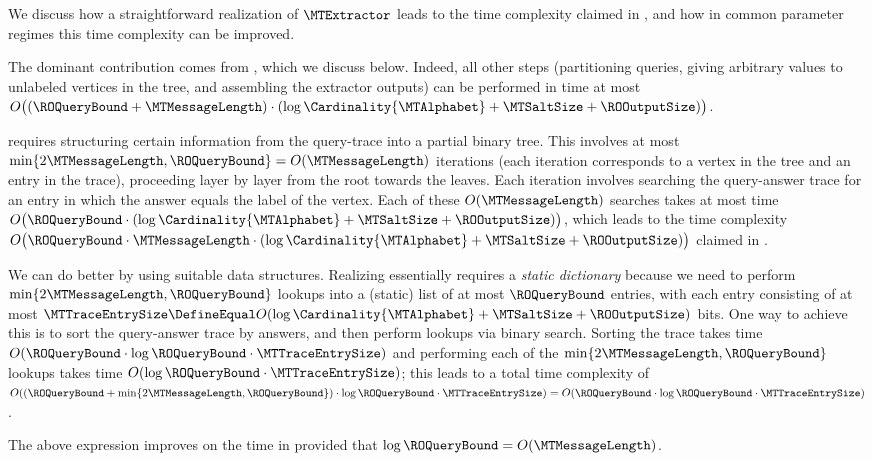 \begin{remark}
\label{remark:mt-extractor-time}
We discuss how a straightforward realization of $\MTExtractor$ leads to the time complexity claimed in , and how in common parameter regimes this time complexity can be improved.

The dominant contribution comes from , which we discuss below. Indeed, all other steps (partitioning queries, giving arbitrary values to unlabeled vertices in the tree, and assembling the extractor outputs) can be performed in time at most $O\big((\ROQueryBound + \MTMessageLength) \cdot (\log\Cardinality{\MTAlphabet} + \MTSaltSize + \ROOutputSize)\big)$.

 requires structuring certain information from the query-trace into a partial binary tree. This involves at most $\min\{2\MTMessageLength,\ROQueryBound\}=O(\MTMessageLength)$ iterations (each iteration corresponds to a vertex in the tree and an entry in the trace), proceeding layer by layer from the root towards the leaves. Each iteration involves searching the query-answer trace for an entry in which the answer equals the label of the vertex. Each of these $O(\MTMessageLength)$ searches takes at most time $O\big(\ROQueryBound \cdot (\log\Cardinality{\MTAlphabet} + \MTSaltSize + \ROOutputSize)\big)$, which leads to the time complexity $O\big( \ROQueryBound \cdot \MTMessageLength \cdot (\log\Cardinality{\MTAlphabet} + \MTSaltSize + \ROOutputSize)\big)$ claimed in .

We can do better by using suitable data structures. Realizing  essentially requires a \emph{static dictionary} because we need to perform $\min\{2\MTMessageLength,\ROQueryBound\}$ lookups into a (static) list of at most $\ROQueryBound$ entries, with each entry consisting of at most $\MTTraceEntrySize \DefineEqual O(\log\Cardinality{\MTAlphabet} + \MTSaltSize + \ROOutputSize)$ bits. One way to achieve this is to sort the query-answer trace by answers, and then perform lookups via binary search. Sorting the trace takes time $O(\ROQueryBound \cdot \log \ROQueryBound \cdot \MTTraceEntrySize)$ and performing each of the $\min\{2\MTMessageLength,\ROQueryBound\}$ lookups takes time $O(\log \ROQueryBound \cdot \MTTraceEntrySize)$; this leads to a total time complexity of $O((\ROQueryBound+\min\{2\MTMessageLength,\ROQueryBound\}) \cdot \log \ROQueryBound \cdot \MTTraceEntrySize) = O(\ROQueryBound \cdot \log \ROQueryBound \cdot \MTTraceEntrySize)$.

The above expression improves on the time in  provided that $\log \ROQueryBound = O(\MTMessageLength)$.
\end{remark}

